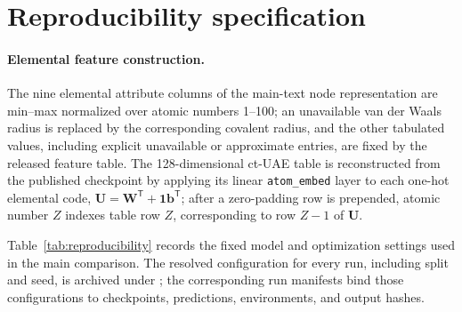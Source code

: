 \documentclass[aps,prb,onecolumn,superscriptaddress,floatfix]{revtex4-2}
\begin{document}
\clearpage
\section{Reproducibility specification}

\paragraph{Elemental feature construction.}
The nine elemental attribute columns of the main-text node representation
are min--max normalized over atomic numbers 1--100; an unavailable van der
Waals radius is replaced by the corresponding covalent radius, and the
other tabulated values, including explicit unavailable or approximate
entries, are fixed by the released feature table.  The 128-dimensional
ct-UAE table is reconstructed from the published checkpoint by applying
its linear \texttt{atom\_embed} layer to each one-hot elemental code,
$\mathbf U=\mathbf W^{\mathsf T}+\mathbf 1\mathbf b^{\mathsf T}$;
after a zero-padding row is prepended, atomic number $Z$ indexes table row
$Z$, corresponding to row $Z-1$ of $\mathbf U$.

Table~\ref{tab:reproducibility} records the fixed model and optimization
settings used in the main comparison.  The resolved configuration for every
run, including split and seed, is archived under ; the
corresponding run manifests bind those configurations to checkpoints,
predictions, environments, and output hashes.
\end{document}
